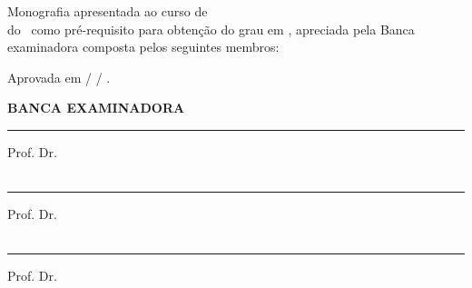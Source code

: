 \documentclass{tcc}
\begin{document}
\begin{center}
	{\large\bf\thetitle} {\large\subtitulo}
\end{center}
\vspace{3em}
\singlespacing 
\noindent
Monografia apresentada ao curso de \nomedocurso\\ do \instituicao\ como pré-requisito para obtenção do grau em \nomedocurso, apreciada pela Banca examinadora composta pelos seguintes membros:
\vspace{0.3in}

\noindent Aprovada em \quad\quad\quad\quad / \quad\quad\quad\quad / \the \year.

\vspace{0.5in}

\begin{center}
	\large \bf BANCA EXAMINADORA    
\end{center}

\vspace{0.7in}

\hrule
\noindent Prof. Dr. \profa\\
\insta\\

\vspace{0.4in}

\hrule
\noindent Prof. Dr. \profb\\
\instb\\

\vspace{0.4in}

\hrule
\noindent Prof. Dr. \profc\\
\instc\\

\vspace{10em}

\vfill

$ $
\vfill

\vfill

\begin{flushright}
	\vspace{10em}
	\singlespacing  %
\end{flushright}

\newpage


\newpage

\newpage



\newpage

\renewcommand{\listfigurename}{\centering LISTA DE FIGURAS}
\listoffigures
\newpage
\end{document}
